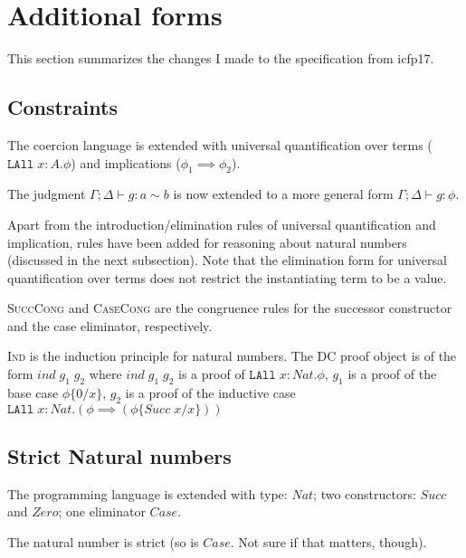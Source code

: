 \documentclass{article}
\begin{document}
\section{Additional forms}
This section summarizes the changes I made to the specification from
icfp17. 

\subsection{Constraints}
The coercion language is extended with universal quantification over
terms ($\texttt{LAll}\;x : A . \phi$) and implications ($\phi_1 \implies
\phi_2$).

The judgment $\Gamma ; \Delta \vdash g : a \sim b$ is now extended to
a more general form $\Gamma ; \Delta \vdash g : \phi$.

Apart from the introduction/elimination rules of universal
quantification and implication, rules have been added for reasoning
about natural numbers (discussed in the next
subsection). Note that the elimination form for universal
quantification over terms does not restrict the instantiating term to
be a value.

\textsc{SuccCong} and \textsc{CaseCong} are the congruence rules for
the successor constructor and the case eliminator, respectively.

\textsc{Ind} is the induction principle for natural numbers. The DC
proof object is of the form $ind\;g_1\;g_2$ where $ind\;g_1\;g_2$ is a
proof of $\texttt{LAll}\;x : Nat . \phi$, $g_1$ is a proof of
the base case $\phi\{0/x\}$, $g_2$ is a proof of the inductive case
$\texttt{LAll}\;x : Nat . (\phi \implies (\phi \{Succ\;x / x\}))$

\subsection{Strict Natural numbers}
The programming language is extended with type: $Nat$; two
constructors: $Succ$ and $Zero$; one eliminator $Case$.

The natural number is strict (so is $Case$. Not sure if that matters,
though).
\end{document}
